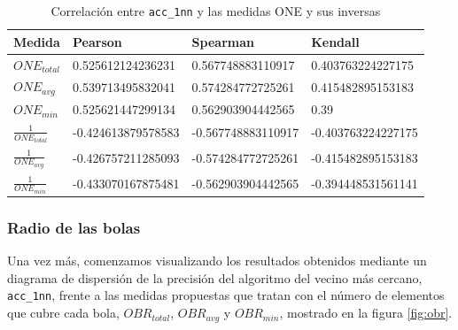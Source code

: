 \documentclass[a4paper,12pt]{report}
\theoremstyle{definition}
\begin{document}
\begin{table}
  \centering
  \begin{tabular}{ l l l l }
    Medida & Pearson & Spearman & Kendall \\ \hline
    $ONE_{total}$ & 0.525612124236231 & 0.567748883110917 & 0.403763224227175 \\
    $ONE_{avg}$ & 0.539713495832041 & 0.574284772725261 & 0.415482895153183 \\
    $ONE_{min}$ & 0.525621447299134 & 0.562903904442565 & 0.39 \\
    $\frac{1}{ONE_{total}}$ & -0.424613879578583 & -0.567748883110917 & -0.403763224227175 \\
    $\frac{1}{ONE_{avg}}$ & -0.426757211285093 & -0.574284772725261 & -0.415482895153183 \\
    $\frac{1}{ONE_{min}}$ & -0.433070167875481 & -0.562903904442565 & -0.394448531561141 \\
  \end{tabular}
  \caption{Correlación entre \texttt{acc\_1nn} y las medidas ONE y sus inversas}
  \label{tab:one}
\end{table}

\subsubsection{Radio de las bolas}

Una vez más, comenzamos visualizando los resultados obtenidos mediante un diagrama de dispersión de la precisión del algoritmo del vecino más cercano, \texttt{acc\_1nn}, frente a las medidas propuestas que tratan con el número de elementos que cubre cada bola, $OBR_{total}$, $OBR_{avg}$ y $OBR_{min}$, mostrado en la figura \ref{fig:obr}.
\end{document}
